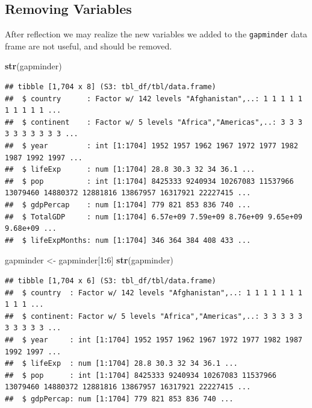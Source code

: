 \documentclass[
]{krantz}
\newenvironment{Shaded}{\begin{snugshade}}{\end{snugshade}}
\newcommand{\DecValTok}[1]{\textcolor[rgb]{0.00,0.00,0.81}{#1}}
\newcommand{\KeywordTok}[1]{\textcolor[rgb]{0.13,0.29,0.53}{\textbf{#1}}}
\newcommand{\NormalTok}[1]{#1}
\newcommand{\OperatorTok}[1]{\textcolor[rgb]{0.81,0.36,0.00}{\textbf{#1}}}
\newcommand{\StringTok}[1]{\textcolor[rgb]{0.31,0.60,0.02}{#1}}
\begin{document}
\hypertarget{removing-variables}{%
\subsection{Removing Variables}\label{removing-variables}}

After reflection we may realize the new variables we added to the \texttt{gapminder} data frame are not useful, and should be removed.

\begin{Shaded}
\begin{Highlighting}[]
\KeywordTok{str}\NormalTok{(gapminder)}
\end{Highlighting}
\end{Shaded}

\begin{verbatim}
## tibble [1,704 x 8] (S3: tbl_df/tbl/data.frame)
##  $ country      : Factor w/ 142 levels "Afghanistan",..: 1 1 1 1 1 1 1 1 1 1 ...
##  $ continent    : Factor w/ 5 levels "Africa","Americas",..: 3 3 3 3 3 3 3 3 3 3 ...
##  $ year         : int [1:1704] 1952 1957 1962 1967 1972 1977 1982 1987 1992 1997 ...
##  $ lifeExp      : num [1:1704] 28.8 30.3 32 34 36.1 ...
##  $ pop          : int [1:1704] 8425333 9240934 10267083 11537966 13079460 14880372 12881816 13867957 16317921 22227415 ...
##  $ gdpPercap    : num [1:1704] 779 821 853 836 740 ...
##  $ TotalGDP     : num [1:1704] 6.57e+09 7.59e+09 8.76e+09 9.65e+09 9.68e+09 ...
##  $ lifeExpMonths: num [1:1704] 346 364 384 408 433 ...
\end{verbatim}

\begin{Shaded}
\begin{Highlighting}[]
\NormalTok{gapminder \textless{}{-}}\StringTok{ }\NormalTok{gapminder[}\DecValTok{1}\OperatorTok{:}\DecValTok{6}\NormalTok{]}
\KeywordTok{str}\NormalTok{(gapminder)}
\end{Highlighting}
\end{Shaded}

\begin{verbatim}
## tibble [1,704 x 6] (S3: tbl_df/tbl/data.frame)
##  $ country  : Factor w/ 142 levels "Afghanistan",..: 1 1 1 1 1 1 1 1 1 1 ...
##  $ continent: Factor w/ 5 levels "Africa","Americas",..: 3 3 3 3 3 3 3 3 3 3 ...
##  $ year     : int [1:1704] 1952 1957 1962 1967 1972 1977 1982 1987 1992 1997 ...
##  $ lifeExp  : num [1:1704] 28.8 30.3 32 34 36.1 ...
##  $ pop      : int [1:1704] 8425333 9240934 10267083 11537966 13079460 14880372 12881816 13867957 16317921 22227415 ...
##  $ gdpPercap: num [1:1704] 779 821 853 836 740 ...
\end{verbatim}
\end{document}
